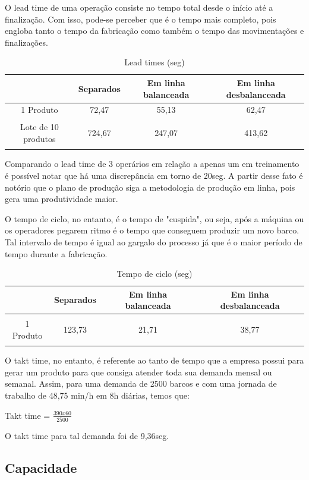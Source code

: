 \documentclass[
	12pt,				%
	oneside,			%
	a4paper,			%
	english,			%
	french,				%
	spanish,			%
	brazil,				%
	]{abntex2}
\begin{document}
O lead time de uma operação consiste no tempo total desde o início até a finalização. Com isso, pode-se perceber que é o tempo mais completo, pois engloba tanto o tempo da fabricação como também o tempo das movimentações e finalizações.

\begin{table}[H]
\centering
\caption{Lead times (seg)}
\begin{tabular}{c|c|c|c}

	&Separados & Em linha balanceada & Em linha desbalanceada \\ \hline
1 Produto & 72,47& 55,13 &62,47 \\ \hline
Lote de 10 produtos & 724,67& 247,07 &413,62
	
\label{tab7}
\end{tabular}	
\end{table}


Comparando o lead time de 3 operários em relação a apenas um em treinamento é possível notar que há uma discrepância em torno de 20seg. A partir desse fato é notório que o plano de produção siga a metodologia de produção em linha, pois gera uma produtividade maior.

O tempo de ciclo, no entanto, é o tempo de "cuspida", ou seja, após a máquina ou os operadores pegarem ritmo é o tempo que conseguem produzir um novo barco. Tal intervalo de tempo é igual ao gargalo do processo já que é o maior período de tempo durante a fabricação.

\begin{table}[H]
\centering
\caption{Tempo de ciclo (seg)}
\begin{tabular}{c|c|c|c}

	&	Separados	&		Em linha balanceada	&		Em linha desbalanceada		\\ \hline
1 Produto	&123,73		&	21,71	&		38,77					

	
\label{tab10}
\end{tabular}	
\end{table}

O takt time, no entanto, é referente ao tanto de tempo que a empresa possui para gerar um produto para que consiga atender toda sua demanda mensal ou semanal. Assim, para uma demanda de 2500 barcos e com uma jornada de trabalho de 48,75 min/h em 8h diárias, temos que:

Takt time = $\frac{390x60}{2500}$

O takt time para tal demanda foi de 9,36seg.

\subsection{Capacidade}
\end{document}
